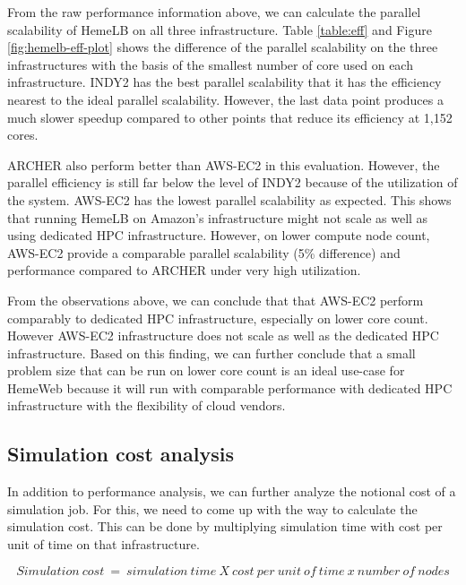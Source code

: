 \vspace{0.5cm}


From the raw performance information above, we can calculate the parallel scalability of HemeLB on all three infrastructure. Table \ref{table:eff} and Figure \ref{fig:hemelb-eff-plot} shows the difference of the parallel scalability on the three infrastructures with the basis of the smallest number of core used on each infrastructure. INDY2 has the best parallel scalability that it has the efficiency nearest to the ideal parallel scalability. However, the last data point produces a much slower speedup compared to other points that reduce its efficiency at 1,152 cores. 

ARCHER also perform better than AWS-EC2 in this evaluation. However, the parallel efficiency is still far below the level of INDY2 because of the utilization of the system. AWS-EC2 has the lowest parallel scalability as expected. This shows that running HemeLB on Amazon's infrastructure might not scale as well as using dedicated HPC infrastructure. However, on lower compute node count, AWS-EC2 provide a comparable parallel scalability (5\% difference) and performance compared to ARCHER under very high utilization. 


From the observations above, we can conclude  that that AWS-EC2 perform comparably to dedicated HPC infrastructure, especially on lower core count. However AWS-EC2 infrastructure does not scale as well as the dedicated HPC infrastructure. Based on this finding, we can further conclude that a small problem size that can be run on lower core count is an ideal use-case for HemeWeb because it will run with comparable performance with dedicated HPC infrastructure with the flexibility of cloud vendors.



\subsection{Simulation cost analysis}

In addition to performance analysis, we can further analyze the notional cost of a simulation job. For this, we need to come up with the way to calculate the simulation cost. This can be done by multiplying simulation time with cost per unit of time on that infrastructure.

\begin{displaymath}
 Simulation\ cost\ =\ simulation\ time\ X\ cost\ per\ unit\ of\ time\ x\ number\ of\ nodes
\end{displaymath}



